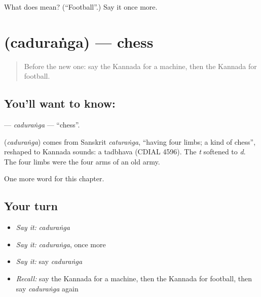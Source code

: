 \begin{tcolorbox}[breakable,colback=teal!4,colframe=teal!35!black,title={Before you move on}]
What does  mean? (\textquotedblleft{}Football\textquotedblright{}.) Say it once more.
\end{tcolorbox}
\section[\texorpdfstring{\kn{ಚದುರಂಗ} (caduraṅga)}{ಚದುರಂಗ (caduraṅga)}]{ (caduraṅga) — chess}

\label{lesson:KA-C228-caduranga}



\begin{quote}
Before the new one: say the Kannada for a machine, then the Kannada for football.
\end{quote}

\subsection*{You'll want to know: }
\textbf{} — \emph{caduraṅga} — \textquotedblleft{}chess\textquotedblright{}.

\begin{cousinweb}
\textbf{} (\emph{caduraṅga}) comes from Sanskrit \emph{caturaṅga}, \textquotedblleft{}having four limbs; a kind of chess\textquotedblright{}, reshaped to Kannada sounds: a tadbhava (CDIAL 4596). The \emph{t} softened to \emph{d}. The four limbs were the four arms of an old army.
\end{cousinweb}

\begin{grammarlens}[title={What you've built}]
One more word for this chapter.
\end{grammarlens}

\subsection*{Your turn}
\begin{itemize}
\raggedright
  \item \emph{Say it:} \emph{caduraṅga}
  \item \emph{Say it:} \emph{caduraṅga}, once more
  \item \emph{Say it:} say \emph{caduraṅga}
  \item \emph{Recall:} say the Kannada for a machine, then the Kannada for football, then say \emph{caduraṅga} again
\end{itemize}

